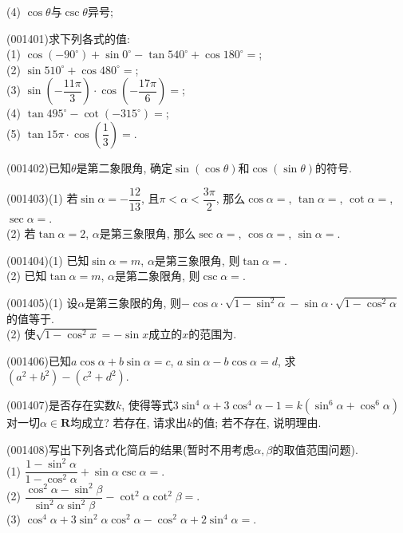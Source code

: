 (4) $\cos\theta$与$\csc\theta$异号; 
\item (001401)求下列各式的值:\\ 
(1) $\cos (-90^\circ)+\sin 0^\circ-\tan 540^\circ+\cos 180^\circ=$;\\ 
(2) $\sin 510^\circ+\cos 480^\circ=$;\\ 
(3) $\sin\left(-\dfrac{11\pi}{3}\right)\cdot\cos\left(-\dfrac{17\pi}{6}\right)=$;\\ 
(4) $\tan 495^\circ-\cot(-315^\circ)=$;\\ 
(5) $\tan 15\pi\cdot \cos \left(\dfrac{1}{3}\right)=$.
\item (001402)已知$\theta$是第二象限角, 确定$\sin(\cos\theta)$和$\cos(\sin\theta)$的符号.
\item (001403)(1) 若$\sin\alpha=-\dfrac{12}{13}$, 且$\pi<\alpha<\dfrac{3\pi}{2}$, 那么$\cos\alpha=$, $\tan\alpha=$, $\cot\alpha=$, $\sec\alpha=$.\\ 
(2) 若$\tan\alpha=2$, $\alpha$是第三象限角, 那么$\sec\alpha=$, $\cos\alpha=$, $\sin\alpha=$.
\item (001404)(1) 已知$\sin\alpha=m$, $\alpha$是第三象限角, 则$\tan\alpha=$.\\ 
(2) 已知$\tan\alpha=m$, $\alpha$是第二象限角, 则$\csc\alpha=$.
\item (001405)(1) 设$\alpha$是第三象限的角, 则$-\cos\alpha\cdot\sqrt{1-\sin^2\alpha}-\sin\alpha\cdot\sqrt{1-\cos^2\alpha}$的值等于.\\ 
(2) 使$\sqrt{1-\cos^2x}=-\sin x$成立的$x$的范围为.
\item (001406)已知$a\cos\alpha+b\sin\alpha=c$, $a\sin\alpha-b\cos\alpha=d$, 求$(a^2+b^2)-(c^2+d^2)$.
\item (001407)是否存在实数$k$, 使得等式$3\sin^4\alpha+3\cos^4\alpha-1=k(\sin^6\alpha+\cos^6\alpha)$对一切$\alpha\in\mathbf{R}$均成立? 若存在, 请求出$k$的值; 若不存在, 说明理由.
\item (001408)写出下列各式化简后的结果(暂时不用考虑$\alpha,\beta$的取值范围问题).\\ 
(1) $\dfrac{1-\sin^2\alpha}{1-\cos^2\alpha}+\sin\alpha\csc\alpha=$.\\ 
(2) $\dfrac{\cos^2\alpha-\sin^2\beta}{\sin^2\alpha\sin^2\beta}-\cot^2\alpha\cot^2\beta=$.\\ 
(3) $\cos^4\alpha+3\sin^2\alpha\cos^2\alpha-\cos^2\alpha+2\sin^4\alpha=$.\\ 
